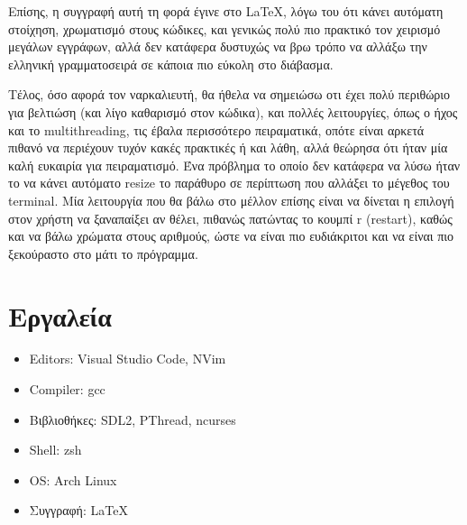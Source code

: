 \documentclass{article}
\begin{document}
    Επίσης, η συγγραφή αυτή τη φορά έγινε στο \LaTeX, λόγω του ότι κάνει αυτόματη στοίχηση, χρωματισμό στους
    κώδικες, και γενικώς πολύ πιο πρακτικό τον χειρισμό μεγάλων εγγράφων, αλλά δεν κατάφερα δυστυχώς να βρω τρόπο
    να αλλάξω την ελληνική γραμματοσειρά σε κάποια πιο εύκολη στο διάβασμα.  
    
    Τέλος, όσο αφορά τον ναρκαλιευτή, θα ήθελα να σημειώσω οτι έχει πολύ περιθώριο για βελτιώση (και λίγο καθαρισμό στον κώδικα),
    και πολλές λειτουργίες, όπως ο ήχος και το multithreading, τις έβαλα περισσότερο πειραματικά, οπότε είναι αρκετά πιθανό να περιέχουν τυχόν
    κακές πρακτικές ή και λάθη, αλλά θεώρησα ότι ήταν μία καλή ευκαιρία για πειραματισμό. Ένα πρόβλημα το οποίο δεν κατάφερα
    να λύσω ήταν το να κάνει αυτόματο resize το παράθυρο σε περίπτωση που αλλάξει το μέγεθος του terminal. Μία λειτουργία που 
    θα βάλω στο μέλλον επίσης είναι να δίνεται η επιλογή στον χρήστη να ξαναπαίξει αν θέλει, πιθανώς πατώντας το κουμπί r (restart),
    καθώς και να βάλω χρώματα στους αριθμούς, ώστε να είναι πιο ευδιάκριτοι και να είναι πιο ξεκούραστο στο μάτι το πρόγραμμα.

\section{Εργαλεία}

    \begin{itemize}
        \item Editors: Visual Studio Code, NVim
        \item Compiler: gcc
        \item Βιβλιοθήκες: SDL2, PThread, ncurses
        \item Shell: zsh
        \item OS: Arch Linux
        \item Συγγραφή: \LaTeX
    \end{itemize}
\end{document}
